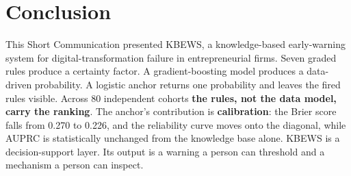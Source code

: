 \documentclass[preprint,12pt]{elsarticle}
\begin{document}
\section{Conclusion}
This Short Communication presented KBEWS, a knowledge-based early-warning system for digital-transformation failure in entrepreneurial firms. Seven graded rules produce a certainty factor. A gradient-boosting model produces a data-driven probability. A logistic anchor returns one probability and leaves the fired rules visible. Across 80 independent cohorts \textbf{the rules, not the data model, carry the ranking}. The anchor's contribution is \textbf{calibration}: the Brier score falls from 0.270 to 0.226, and the reliability curve moves onto the diagonal, while AUPRC is statistically unchanged from the knowledge base alone. KBEWS is a decision-support layer. Its output is a warning a person can threshold and a mechanism a person can inspect.
\end{document}
